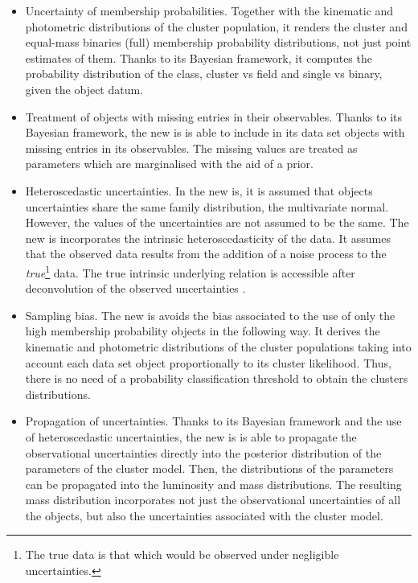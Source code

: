 \begin{itemize}
\item Uncertainty of membership probabilities. Together with the kinematic and photometric distributions of the cluster population, it renders the cluster and equal-mass binaries (full) membership probability distributions, not just point estimates of them. Thanks to its Bayesian framework, it computes the probability distribution of the class, cluster vs field and single vs binary, given the object datum. 

\item Treatment of objects with missing entries in their observables. Thanks to its Bayesian framework, the new \gls{is} is able to include in its data set objects with missing entries in its observables. The missing values are treated as parameters which are marginalised with the aid of a prior.

\item Heteroscedastic uncertainties. In the new \gls{is}, it is assumed that objects uncertainties share the same family distribution, the multivariate normal. However, the values of the uncertainties are not assumed to be the same. The new \gls{is} incorporates the intrinsic heteroscedasticity of the data. It assumes that the observed data results from the addition of a noise process to the \emph{true}\footnote{The true data is that which would be observed under negligible uncertainties.} data. The true intrinsic underlying relation is accessible after deconvolution of the observed uncertainties \cite[see][for another example of deconvolution]{2009ApJ...700.1794B}.

\item Sampling bias. The new \gls{is} avoids the bias associated to the use of only the high membership probability objects in the following way. It derives the kinematic and photometric distributions of the cluster populations taking into account each data set object proportionally to its cluster likelihood. Thus, there is no need of a probability classification threshold to obtain the clusters distributions.

\item Propagation of uncertainties. Thanks to its Bayesian framework and the use of heteroscedastic uncertainties, the new \gls{is} is able to propagate the observational uncertainties directly into the posterior distribution of the parameters of the cluster model. Then, the distributions of the parameters can be propagated into the luminosity and mass distributions. The resulting mass distribution incorporates not just the observational uncertainties of all the objects, but also the uncertainties associated with the cluster model. 
\end{itemize}

